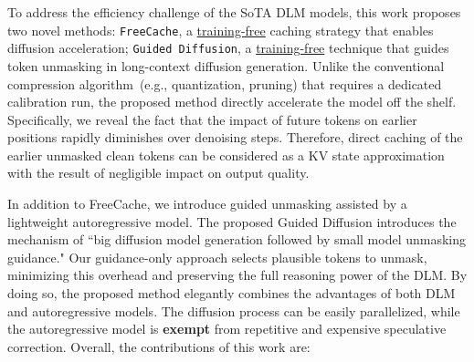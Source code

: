 
To address the efficiency challenge of the SoTA DLM models, this work proposes two novel methods:   
\texttt{FreeCache}, a \underline{training-free} caching strategy that enables diffusion acceleration;  \texttt{Guided Diffusion}, a \underline{training-free} technique that guides token unmasking in long-context diffusion generation.
Unlike the conventional compression algorithm~(e.g., quantization, pruning) that requires a dedicated calibration run, the proposed method directly accelerate the model off the shelf. 
Specifically, we reveal the fact that the impact of future tokens on earlier positions rapidly diminishes over denoising steps. 
Therefore, direct caching of the earlier unmasked clean tokens can be considered as a KV state approximation with the result of negligible impact on output quality. 

In addition to FreeCache, we introduce guided unmasking assisted by a lightweight autoregressive model. 
The proposed Guided Diffusion introduces the mechanism of ``big diffusion model generation followed by small model unmasking guidance." 
Our guidance-only approach selects plausible tokens to unmask, minimizing this overhead and preserving the full reasoning power of the DLM. By doing so, the proposed method elegantly combines the advantages of both DLM and autoregressive models. The diffusion process can be easily parallelized, while the autoregressive model is \textbf{exempt} from repetitive and expensive speculative correction. 
Overall, the contributions of this work are:




